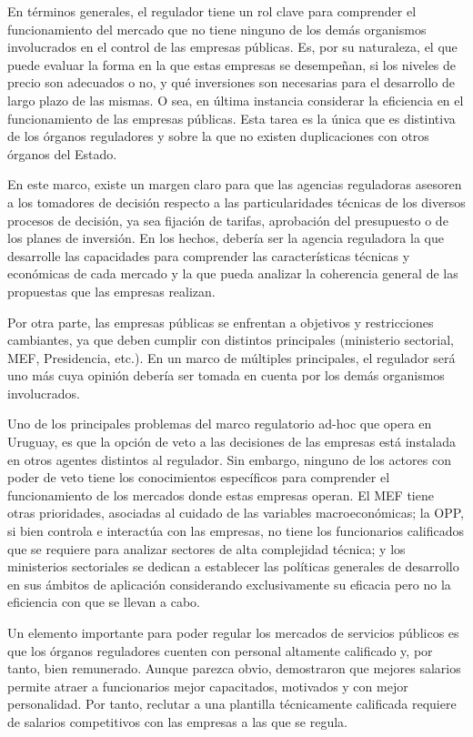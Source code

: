 \documentclass[
  12pt,
  spanish,
]{book}
\begin{document}
En términos generales, el regulador tiene un rol clave para comprender el funcionamiento del mercado que no tiene ninguno de los demás organismos involucrados en el control de las empresas públicas. Es, por su naturaleza, el que puede evaluar la forma en la que estas empresas se desempeñan, si los niveles de precio son adecuados o no, y qué inversiones son necesarias para el desarrollo de largo plazo de las mismas. O sea, en última instancia considerar la eficiencia en el funcionamiento de las empresas públicas. Esta tarea es la única que es distintiva de los órganos reguladores y sobre la que no existen duplicaciones con otros órganos del Estado.

En este marco, existe un margen claro para que las agencias reguladoras asesoren a los tomadores de decisión respecto a las particularidades técnicas de los diversos procesos de decisión, ya sea fijación de tarifas, aprobación del presupuesto o de los planes de inversión. En los hechos, debería ser la agencia reguladora la que desarrolle las capacidades para comprender las características técnicas y económicas de cada mercado y la que pueda analizar la coherencia general de las propuestas que las empresas realizan.

Por otra parte, las empresas públicas se enfrentan a objetivos y restricciones cambiantes, ya que deben cumplir con distintos principales (ministerio sectorial, MEF, Presidencia, etc.). En un marco de múltiples principales, el regulador será uno más cuya opinión debería ser tomada en cuenta por los demás organismos involucrados.

Uno de los principales problemas del marco regulatorio ad-hoc que opera en Uruguay, es que la opción de veto a las decisiones de las empresas está instalada en otros agentes distintos al regulador. Sin embargo, ninguno de los actores con poder de veto tiene los conocimientos específicos para comprender el funcionamiento de los mercados donde estas empresas operan. El MEF tiene otras prioridades, asociadas al cuidado de las variables macroeconómicas; la OPP, si bien controla e interactúa con las empresas, no tiene los funcionarios calificados que se requiere para analizar sectores de alta complejidad técnica; y los ministerios sectoriales se dedican a establecer las políticas generales de desarrollo en sus ámbitos de aplicación considerando exclusivamente su eficacia pero no la eficiencia con que se llevan a cabo.

Un elemento importante para poder regular los mercados de servicios públicos es que los órganos reguladores cuenten con personal altamente calificado y, por tanto, bien remunerado. Aunque parezca obvio, \citet{DalBo2013} demostraron que mejores salarios permite atraer a funcionarios mejor capacitados, motivados y con mejor personalidad. Por tanto, reclutar a una plantilla técnicamente calificada requiere de salarios competitivos con las empresas a las que se regula.
\end{document}
